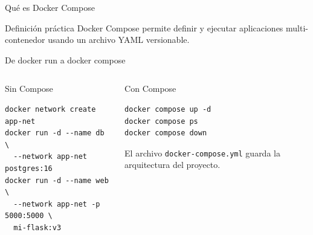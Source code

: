 \documentclass[aspectratio=169]{beamer}
\begin{document}
\begin{frame}{Qué es Docker Compose}
  \begin{center}
  \end{center}
  \vspace{0.2cm}
  \begin{block}{Definición práctica}
    Docker Compose permite definir y ejecutar aplicaciones multi-contenedor usando un archivo YAML versionable.
  \end{block}
\end{frame}

\begin{frame}[fragile]{De docker run a docker compose}
  \footnotesize
  \begin{columns}[T]
    \begin{alertblock}{Sin Compose}
\begin{lstlisting}[style=terminal, basicstyle=\ttfamily\tiny]
docker network create app-net
docker run -d --name db \
  --network app-net postgres:16
docker run -d --name web \
  --network app-net -p 5000:5000 \
  mi-flask:v3
\end{lstlisting}
    \end{alertblock}
    \begin{exampleblock}{Con Compose}
\begin{lstlisting}[style=terminal, basicstyle=\ttfamily\tiny]
docker compose up -d
docker compose ps
docker compose down
\end{lstlisting}
      \vspace{0.1cm}
      El archivo \texttt{docker-compose.yml} guarda la arquitectura del proyecto.
    \end{exampleblock}
  \end{columns}
\end{frame}
\end{document}
